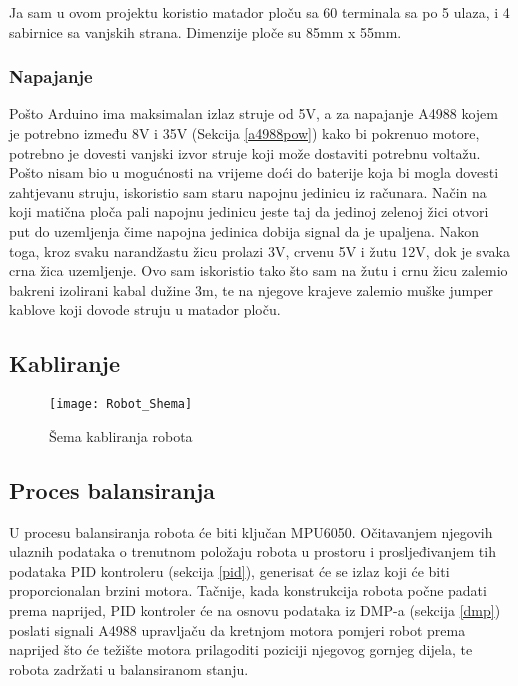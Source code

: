 \documentclass[../Document.tex]{subfiles}
\begin{document}

Ja sam u ovom projektu koristio matador ploču sa 60 terminala sa po 5 ulaza, i 4 sabirnice sa vanjskih strana. Dimenzije ploče su 85mm x 55mm.

\subsubsection{Napajanje}
Pošto Arduino ima maksimalan izlaz struje od 5V, a za napajanje A4988 kojem je potrebno između 8V i 35V (Sekcija \ref{a4988pow}) kako bi pokrenuo motore, potrebno je dovesti vanjski izvor struje koji može dostaviti potrebnu voltažu. Pošto nisam bio u mogućnosti na vrijeme doći do baterije koja bi mogla dovesti zahtjevanu struju, iskoristio sam staru napojnu jedinicu iz računara. Način na koji matična ploča pali napojnu jedinicu jeste taj da jedinoj zelenoj žici otvori put do uzemljenja čime napojna jedinica dobija signal da je upaljena. Nakon toga, kroz svaku narandžastu žicu prolazi 3V, crvenu 5V i žutu 12V, dok je svaka crna žica uzemljenje. Ovo sam iskoristio tako što sam na žutu i crnu žicu zalemio bakreni izolirani kabal dužine 3m, te na njegove krajeve zalemio muške jumper kablove koji dovode struju u matador ploču.


\subsection{Kabliranje}

\begin{figure}[h!]
    \centering
    \texttt{[image: Robot\_Shema]}
    \caption{Šema kabliranja robota}
\end{figure}

\subsection{Proces balansiranja}
U procesu balansiranja robota će biti ključan MPU6050. Očitavanjem njegovih ulaznih podataka o trenutnom položaju robota u prostoru i prosljeđivanjem tih podataka PID kontroleru (sekcija \ref{pid}), generisat će se izlaz koji će biti proporcionalan brzini motora. Tačnije, kada konstrukcija robota počne padati prema naprijed, PID kontroler će na osnovu podataka iz DMP-a (sekcija \ref{dmp}) poslati signali A4988 upravljaču da kretnjom motora pomjeri robot prema naprijed što će težište motora prilagoditi poziciji njegovog gornjeg dijela, te robota zadržati u balansiranom stanju.
\end{document}
